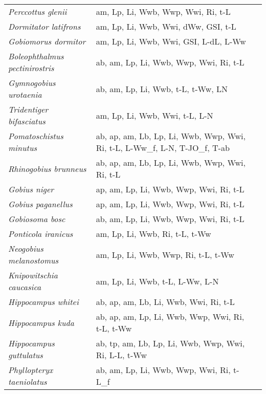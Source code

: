 {\begin{longtable}[c]{p{3.5cm}p{5.5cm}p{5.5cm}}
\emph{Perccottus glenii} &  am, Lp, Li, Wwb, Wwp, Wwi, Ri, t-L & \citet{JoanDari2011} \\
\emph{Dormitator latifrons} &  am, Lp, Li, Wwb, Wwi, dWw, GSI, t-L & \citet{ChanNava1984,BastRodr2019} \\
\emph{Gobiomorus dormitor} &  am, Lp, Li, Wwb, Wwi, GSI, L-dL, L-Ww & \citet{BachNeal2004,Bach2002} \\
\emph{Boleophthalmus pectinirostris} &  ab, am, Lp, Li, Wwb, Wwp, Wwi, Ri, t-L & \citet{Take2008,WansQiyo2004,NanaTake2005} \\
\emph{Gymnogobius urotaenia} &  ab, am, Lp, Li, Wwb, t-L, t-Ww, LN & \citet{KolpDemi2011} \\
\emph{Tridentiger bifasciatus} &  am, Lp, Li, Wwb, Wwi, t-L, L-N & \citet{QinXian2020,Slat2005} \\
\emph{Pomatoschistus minutus} &  ab, ap, am, Lb, Lp, Li, Wwb, Wwp, Wwi, Ri, t-L, L-Ww\_f, L-N, T-JO\_f, T-ab & \citet{Fond1973,BoucQuig1990,Frei2010,Penn1969,BoucQuig1989,Gaas1977} \\
\emph{Rhinogobius brunneus} &  ab, ap, am, Lb, Lp, Li, Wwb, Wwp, Wwi, Ri, t-L & \citet{KondMead2013,HeimFull2007} \\
\emph{Gobius niger} &  ap, am, Lp, Li, Wwb, Wwp, Wwi, Ri, t-L & \citet{SilvGrod1997} \\
\emph{Gobius paganellus} &  ap, am, Lp, Li, Wwb, Wwp, Wwi, Ri, t-L & \citet{AzevSima2000} \\
\emph{Gobiosoma bosc} &  ab, am, Lp, Li, Wwb, Wwp, Wwi, Ri, t-L &  \\
\emph{Ponticola iranicus} &  am, Lp, Li, Wwb, Ri, t-L, t-Ww & \citet{MohaMous2016} \\
\emph{Neogobius melanostomus} &  am, Lp, Li, Wwb, Wwp, Ri, t-L, t-Ww & \citet{ShemKiri2009} \\
\emph{Knipowitschia caucasica} &  am, Lp, Li, Wwb, t-L, L-Ww, L-N & \citet{GucuErdo2017,KevrKokk1990} \\
\emph{Hippocampus whitei} &  ab, ap, am, Lb, Li, Wwb, Wwi, Ri, t-L & \citet{Pita2007,WongBenz2003,VincGile2003} \\
\emph{Hippocampus kuda} &  ab, ap, am, Lp, Li, Wwb, Wwp, Wwi, Ri, t-L, t-Ww & \citet{SaavMasd2014,ChooLiew2006} \\
\emph{Hippocampus guttulatus} &  ab, tp, am, Lb, Lp, Li, Wwb, Wwp, Wwi, Ri, L-L, t-Ww & \citet{CurtVinc2006,PlanQuin2010} \\
\emph{Phyllopteryx taeniolatus} &  ab, am, Lp, Li, Wwb, Wwp, Wwi, Ri, t-L\_f & \citet{ForsLowe2006,SancBoot2005} \\

\end{longtable}}
